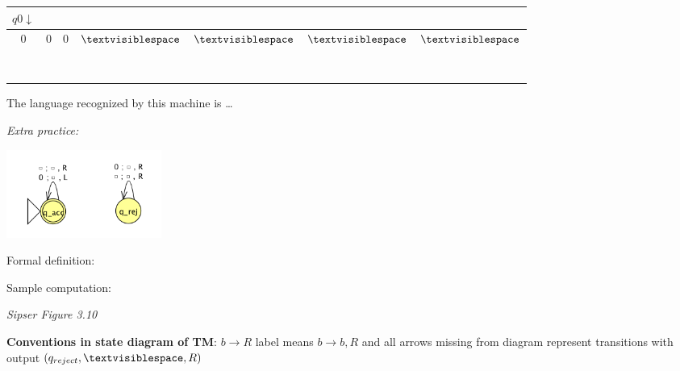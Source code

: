 \documentclass[12pt, oneside]{article}
\begin{document}
\begin{tabular}{|c|c|c|c|c|c|c|}
\hline
\multicolumn{1}{|c}{$q0\downarrow$} &  \multicolumn{6}{c|}{\phantom{A}}\\
\hline
$0$ & $0$  & $0$ & $\textvisiblespace $& $\textvisiblespace $& $\textvisiblespace $&  $\textvisiblespace $\\
\hline
\multicolumn{7}{|c|}{\phantom{A}}\\
\hline
\phantom{AA} & \phantom{AA}& \phantom{AA}& \phantom{AA}& \phantom{AA}& \phantom{AA}& \phantom{AA} \\
\hline
\multicolumn{7}{|c|}{\phantom{A}}\\
\hline
\phantom{AA} & \phantom{AA}& \phantom{AA}& \phantom{AA}& \phantom{AA}& \phantom{AA}& \phantom{AA} \\
\hline
\multicolumn{7}{|c|}{\phantom{A}}\\
\hline
\phantom{AA} & \phantom{AA}& \phantom{AA}& \phantom{AA}& \phantom{AA}& \phantom{AA}& \phantom{AA} \\
\hline
\multicolumn{7}{|c|}{\phantom{A}}\\
\hline
\phantom{AA} & \phantom{AA}& \phantom{AA}& \phantom{AA}& \phantom{AA}& \phantom{AA}& \phantom{AA} \\
\hline
\end{tabular}

\vfill

The language recognized by this machine is \ldots

{\it Extra practice:}

 \includegraphics[width=2in]{../../resources/machines/Lect13TM2.png} 


 Formal definition: 


 Sample computation: 
 

\newpage
{\it Sipser Figure  3.10}

{\bf Conventions in state diagram of TM}: $b \to R$ label means $b \to b, R$ and
all arrows missing from diagram represent transitions with output $(q_{reject}, \textvisiblespace , R)$
\end{document}
